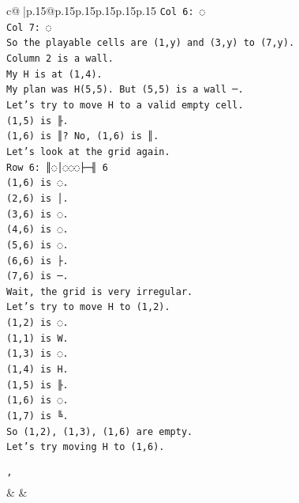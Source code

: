 \documentclass{article}
\begin{document}
{\begin{supertabular}{c@{$\;$}|p{.15\linewidth}@{}p{.15\linewidth}p{.15\linewidth}p{.15\linewidth}p{.15\linewidth}p{.15\linewidth}}
{{{\texttt{Col 6: ◌} \\
\texttt{Col 7: ◌} \\
\texttt{So the playable cells are (1,y) and (3,y) to (7,y).} \\
\texttt{Column 2 is a wall.} \\
\texttt{My H is at (1,4).} \\
\texttt{My plan was H(5,5). But (5,5) is a wall ─.} \\
\texttt{Let's try to move H to a valid empty cell.} \\
\texttt{(1,5) is ╟.} \\
\texttt{(1,6) is ║? No, (1,6) is ║.} \\
\texttt{Let's look at the grid again.} \\
\texttt{Row 6: ║◌│◌◌◌├─╢ 6} \\
\texttt{(1,6) is ◌.} \\
\texttt{(2,6) is │.} \\
\texttt{(3,6) is ◌.} \\
\texttt{(4,6) is ◌.} \\
\texttt{(5,6) is ◌.} \\
\texttt{(6,6) is ├.} \\
\texttt{(7,6) is ─.} \\
\texttt{Wait, the grid is very irregular.} \\
\texttt{Let's try to move H to (1,2).} \\
\texttt{(1,2) is ◌.} \\
\texttt{(1,1) is W.} \\
\texttt{(1,3) is ◌.} \\
\texttt{(1,4) is H.} \\
\texttt{(1,5) is ╟.} \\
\texttt{(1,6) is ◌.} \\
\texttt{(1,7) is ╚.} \\
\texttt{So (1,2), (1,3), (1,6) are empty.} \\
\texttt{Let's try moving H to (1,6).} \\
\\ 
\texttt{'} \\
            }
        }
    }
    & & \\ \\


\end{supertabular}}
\end{document}
